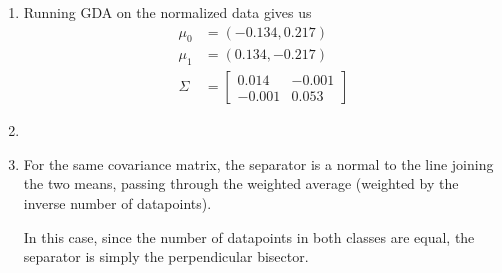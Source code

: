 \documentclass[12pt]{article}
\begin{document}
\begin{enumerate}
    \item Running GDA on the normalized data gives us 
    \begin{align*}
        \mu_0 &= (-0.134,0.217) \\
        \mu_1 &= (0.134,-0.217) \\
        \Sigma &= 
        \begin{bmatrix}
            0.014 & -0.001 \\
            -0.001 & 0.053
        \end{bmatrix}
    \end{align*}

    \item \begin{center}\end{center}

    \item For the same covariance matrix, the separator is a normal to the line joining the two means, passing through the weighted average (weighted by the inverse number of datapoints).

    In this case, since the number of datapoints in both classes are equal, the separator is simply the perpendicular bisector.

    \begin{center}\end{center}


\end{enumerate}
\end{document}

